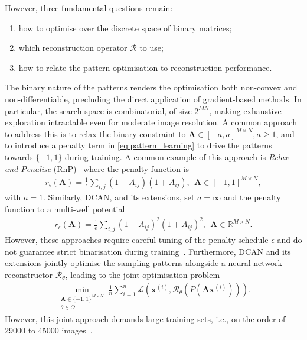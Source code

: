 \documentclass[lettersize,journal]{IEEEtran}
\providecommand{\R}{{\mathbb R}}
\providecommand{\BA}{{\mathbf A}}
\providecommand{\Bx}{{\mathbf x}}
\begin{document}
However, three fundamental questions remain:
\begin{enumerate}[noitemsep]
    \item how to optimise over the discrete space of binary matrices;
    \item which reconstruction operator $\mathcal{R}$ to use;
    \item how to relate the pattern optimisation to reconstruction performance.
\end{enumerate}
The binary nature of the patterns renders the optimisation both non-convex and non-differentiable, precluding the direct application of gradient-based methods. 
In particular, the search space is combinatorial, of size $2^{MN}$, making exhaustive exploration intractable even for moderate image resolution. 
A common approach to address this is to relax the binary constraint to $\BA \in [-a,a]^{M \times N}, a\ge1$, and to introduce a penalty term in \eqref{eq:pattern_learning} to drive the patterns towards $\{-1,1\}$ during training. 
A common example of this approach is \textit{Relax-and-Penalise} (RnP)~\cite{Lucidi_2010_ExactPenaltyFunctions} where the penalty function is
\begin{align}
    \label{eq:rnp}
    r_\epsilon(\BA) = \frac{1}{\epsilon}\sum_{i,j} (1-A_{ij})(1+A_{ij}),\ \  \BA \in [-1,1]^{M \times N},
\end{align} 
with $a = 1$.
Similarly, DCAN, and its extensions, set $a = \infty$ and the penalty function to a multi-well potential
\begin{align}
\label{eq:multi_well}
    r_\epsilon(\BA) = \frac{1}{\epsilon} \sum_{i,j} (1-A_{ij})^2(1+A_{ij})^2, \ \  \BA \in \R^{M \times N}.
\end{align}
However, these approaches require careful tuning of the penalty schedule $\epsilon$ and do not guarantee strict binarisation during training~\cite{Lucidi_2010_ExactPenaltyFunctions}.
Furthermore, DCAN and its extensions jointly optimise the sampling patterns alongside a neural network reconstructor $\mathcal{R}_\theta$, leading to the joint optimisation problem
\begin{align}
    \label{eq:joint_pattern_learning}
    \min_{\substack{\BA \in \{-1,1\}^{M \times N} \\ \theta \in \Theta}} \frac{1}{n} \sum_{i=1}^n \mathcal{L}(\Bx^{(i)}, \mathcal{R}_\theta(P(\BA \Bx^{(i)}))).
\end{align}
However, this joint approach demands large training sets, i.e., on the order of \num{29000} to \num{45000} images~\cite{Wang_2022_SinglepixelImagingUsing, Deng_2024_SinglePixelImagingBased}.
\end{document}
